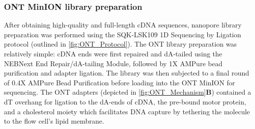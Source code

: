 \subsubsection{ONT MinION library preparation}
\label{sec: ONTlib_preparation}
After obtaining high-quality and full-length cDNA sequences, nanopore library preparation was performed using the SQK-LSK109 1D Sequencing by Ligation protocol (outlined in \cref{fig:ONT_Protocol}). The ONT library preparation was relatively simple: cDNA ends were first repaired and dA-tailed using the NEBNext End Repair/dA-tailing Module, followed by 1X AMPure bead purification and adapter ligation. The library was then subjected to a final round of 0.4X AMPure Bead Purification before loading into the ONT MinION for sequencing. The ONT adapters (depicted in \cref{fig:ONT_Mechanism}\textbf{B}) contained a dT overhang for ligation to the dA-ends of cDNA, the pre-bound motor protein, and a cholesterol moiety which facilitates DNA capture by tethering the molecule to the flow cell's lipid membrane.

